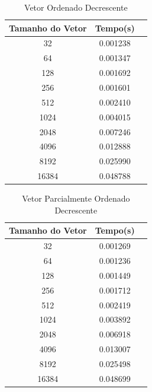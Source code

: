\documentclass[12pt,a4paper,twoside]{report}
\begin{document}
\begin{table}[h]
  \centering
  \caption{Vetor Ordenado Decrescente \label{tab:od}}
  \begin{tabular}{ccc} \\\hline
  \textbf{Tamanho do Vetor}  & \textbf{Tempo(s)} \\\hline
  32                              & 0.001238          \\\hline
  64                              & 0.001347          \\\hline
  128                             & 0.001692          \\\hline
  256                             & 0.001601          \\\hline
  512                             & 0.002410          \\\hline
  1024                            & 0.004015          \\\hline
  2048                            & 0.007246          \\\hline
  4096                            & 0.012888         \\\hline
  8192                            & 0.025990         \\\hline
  16384                           & 0.048788
  \\\hline
  \end{tabular}
\end{table}


\begin{table}[h]
  \centering
  \caption{Vetor Parcialmente Ordenado Decrescente \label{tab:pod}}
  \begin{tabular}{ccc} \\\hline
  \textbf{Tamanho do Vetor}  & \textbf{Tempo(s)} \\\hline
  32                              & 0.001269          \\\hline
  64                              & 0.001236          \\\hline
  128                             & 0.001449          \\\hline
  256                             & 0.001712          \\\hline
  512                             & 0.002419          \\\hline
  1024                            & 0.003892          \\\hline
  2048                            & 0.006918          \\\hline
  4096                            & 0.013007         \\\hline
  8192                            & 0.025498         \\\hline
  16384                           & 0.048699
  \\\hline
  \end{tabular}
\end{table}
\end{document}
